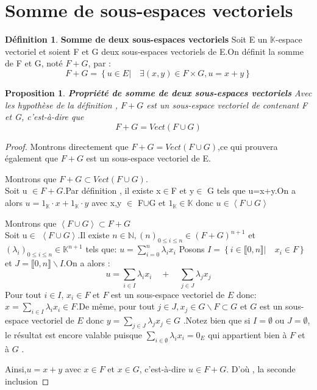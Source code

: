 \documentclass[12pt]{book}
\theoremstyle{definition}\newtheorem{dfn}{Définition}[chapter]
\theoremstyle{plain}\newtheorem{thm}{Théorème}[chapter]
\theoremstyle{plain}\newtheorem{prp}{Proposition}[chapter]
\theoremstyle{plain}\newtheorem{lem}{\bf Lemme}[chapter]
\theoremstyle{plain}\newtheorem{axm}{\bf Axiome}[chapter]
\theoremstyle{plain}\newtheorem{lmm}{\bf Lemme}[chapter]
\theoremstyle{plain}\newtheorem{exm}{\bf Example}[chapter]
\theoremstyle{plain}\newtheorem{cor}{\bf Corollaire}[chapter]
\theoremstyle{remark}\newtheorem{rem}{Remarque}[chapter]
\begin{document}
\section{Somme de sous-espaces vectoriels}
\begin{dfn}{\bf Somme de deux sous-espaces vectoriels }
Soit E un $\mathbb{K}$-espace vectoriel et soient F et G deux sous-espaces vectoriels de E.On définit la somme de F et G, noté $F+G$,
par :
$$F+G=\left \{ u\in E |\quad \exists (x,y)\in F\times G,u=x+y \right \} $$
\end{dfn}
\begin{prp}{\bf Propriété de somme de deux sous-espaces vectoriels}
Avec les hypothèse de la définition , $F+G$ est un sous-espace vectoriel  de contenant F et G, c'est-à-dire que
$$F+G=Vect(F\cup G)$$
\end{prp}
\begin{proof}
        Montrons directement que
        $ F+G=Vect(F\cup G)$,ce qui prouvera également que $F+G$
        est un sous-espace vectoriel de
        E.


        Montrons que $ F+G\subset Vect(F\cup G)$.
        \\
        Soit u $\in F+G$.Par définition , il existe x$\in$F et y$\in$ G tels que u=x+y.On a alors $u=1_\mathbb{K}\cdot x+1_\mathbb{K}\cdot y$ avec x,y $\in$ F$\cup$G et $1_\mathbb{K} \in \mathbb{K}$ donc $u\in \left \langle F\cup G \right \rangle$


        Montrons que $\left \langle F\cup G \right \rangle \subset F+G$
\\
Soit u$\in$	$\left \langle F\cup G \right \rangle$.Il existe $n\in \mathbb{N}, (n)_{0\leq i\leq n}\in
(F+G)^{n+1}$ et $(\lambda_i)_{0\leq i\leq n}\in
\mathbb{K}^{n+1}$ tels que: $u=\sum_{i=0}^{n} \lambda_i x_i$
Posons $I=\left \{ i\in \llbracket 0, n \rrbracket |\quad  x_i\in F \right \}$ et $J= \llbracket 0, n \rrbracket \backslash I$.On a alors
:
$$
u=\sum_{i\in I}\lambda_i x_i\quad+\quad \sum_{j\in J}\lambda_j x_j
$$
Pour tout $i \in I$, $x_i \in F$ et $F$ est un sous-espace vectoriel de $E$ donc: $x=\sum_{i\in I}\lambda_i x_i \in F$.De même, pour tout $j \in J, x_j\in G\backslash F \subset G$
et $G$ est un sous-espace vectoriel
de $E$ donc $y=\sum_{j\in J}\lambda_j x_j \in G
$ .Notez bien que si $I=\emptyset$ ou $J=\emptyset$, le résultat est encore valable puisque $\sum_{i\in \emptyset}\lambda_i x_i=0_E$ qui appartient bien à $F$ et à $G$
.

Ainsi,$u=x+y$ avec $x \in F$  et $x \in G$, c'est-à-dire $u \in F+G$. D'où , la seconde inclusion
\end{proof}
\end{document}
